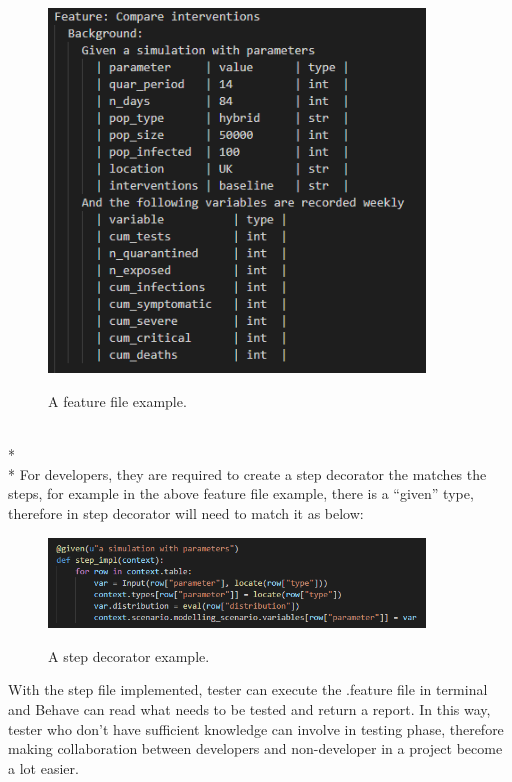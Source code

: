 \begin{figure}[h]
	\centering
	\includegraphics[width=10cm]{figures/featureFile.png}\\
	\caption{A feature file example.}
	\label{fig:figure1}
\end{figure}
\newpage \noindent 
\\*\\*
For developers, they are required to create a step decorator the matches the steps, for example in the above feature file example, there is a “given” type, therefore in step decorator will need to match it as below:
\begin{figure}[H]
	\centering
	\includegraphics[width=10cm]{figures/stepFile.png}\\
	\caption{A step decorator example.}
	\label{fig:figure2}
\end{figure}
\noindent 
With the step file implemented, tester can execute the .feature file in terminal and Behave can read what needs to be tested and return a report. In this way, tester who don’t have sufficient knowledge can involve in testing phase, therefore making collaboration between developers and non-developer in a project become a lot easier.

